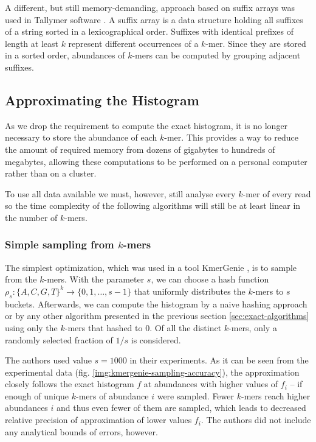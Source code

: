 A different, but still memory-demanding, approach based on suffix arrays was used in Tallymer software \cite{Kurtz2008}.
A suffix array is a data structure holding all suffixes of a string sorted in a lexicographical order. Suffixes with identical
prefixes of length at least $k$ represent different occurrences of a $k$-mer. Since they are stored in a sorted order, 
abundances of $k$-mers can be computed by grouping adjacent suffixes. 

\subsection{Approximating the Histogram}
As we drop the requirement to compute the exact histogram, it is no longer necessary to store the abundance of each $k$-mer.
This provides a way to reduce the amount of required memory from dozens of gigabytes 
to hundreds of megabytes, allowing these computations to be performed on a personal computer rather than on a cluster.  

To use all data available we must, however, still analyse every $k$-mer of every read so the time complexity of the
following algorithms will still be at least linear in the number of $k$-mers.

\subsubsection{Simple sampling from $k$-mers}
\label{sec:simple-sampling}
The simplest optimization, which was used in a tool KmerGenie \cite{Chikhi2013}, is to sample from the $k$-mers.
With the parameter $s$, we can choose a hash function $\rho_s: \{A,C,G,T\}^k \rightarrow \{0, 1, \dots, s-1\}$ 
that uniformly distributes the $k$-mers to $s$ buckets. Afterwards, we can compute the histogram by a naive
hashing approach or by any other algorithm presented in the previous section \ref{sec:exact-algorithms} using only
the $k$-mers that hashed to 0. Of all the distinct $k$-mers, only a randomly selected fraction of $1/s$ is considered.

The authors used value $s=1000$ in their experiments. As it can be seen from the experimental data (fig. \ref{img:kmergenie-sampling-accuracy}),
the approximation closely follows the exact histogram $f$ at abundances with higher values of $f_i$ -- if enough of unique $k$-mers of abundance 
$i$ were sampled. Fewer $k$-mers reach higher abundances $i$ and thus even fewer of them are sampled, which leads  
to decreased relative precision of approximation of lower values $f_i$. The authors did not include any analytical bounds of errors, however.

